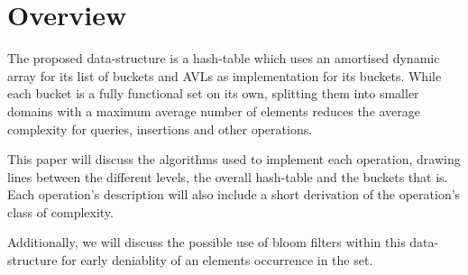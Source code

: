 \section{Overview}

    The proposed data-structure is a hash-table which uses an amortised dynamic
    array for its list of buckets and AVLs as implementation for its buckets.
    While each bucket is a fully functional set on its own, splitting them into
    smaller domains with a maximum average number of elements reduces the
    average complexity for queries, insertions and other operations.

    This paper will discuss the algorithms used to implement each operation,
    drawing lines between the different levels, the overall hash-table and the
    buckets that is. Each operation's description will also include a short
    derivation of the operation's class of complexity.

    Additionally, we will discuss the possible use of bloom filters within this
    data-structure for early deniablity of an elements occurrence in the set.


